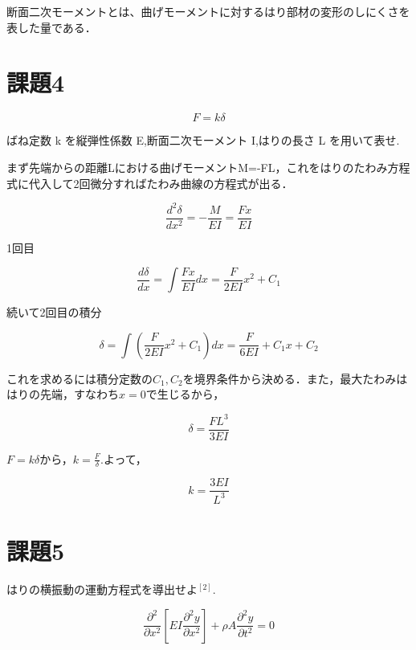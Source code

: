 \documentclass[twocolumn,xelatex,ja=standard,jafont=noto]{bxjsarticle}
\begin{document}
断面二次モーメントとは、曲げモーメントに対するはり部材の変形のしにくさを表した量である．


\section{課題4}

\begin{equation}
			F=k\delta
\end{equation}

ばね定数 k を縦弾性係数 E,断面二次モーメント I,はりの長さ L を用いて表せ.




まず先端からの距離Lにおける曲げモーメントM=-FL，これをはりのたわみ方程式に代入して2回微分すればたわみ曲線の方程式が出る．


\begin{equation}
		\frac{d^{2}\delta}{dx^{2}}=-\frac{M}{EI}=\frac{Fx}{EI}
\end{equation}

1回目

\begin{equation}
		\frac{d\delta}{dx}=\int\frac{Fx}{EI}dx=\frac{F}{2EI}x^{2}+C_{1}
\end{equation}

続いて2回目の積分


\begin{equation}
		\delta=\int(\frac{F}{2EI}x^{2}+C_{1})dx=\frac{F}{6EI}+C_{1}x+C_{2}
\end{equation}

これを求めるには積分定数の$ C_{1},C_{2} $を境界条件から決める．また，最大たわみははりの先端，すなわち$ x=0 $で生じるから，

\begin{equation}
	\delta=\frac{FL^{3}}{3EI}
\end{equation}


$ F=k\delta $から，$ k=\frac{F}{\delta} $.よって，



\begin{equation}
	k=\frac{3EI}{L^{3}}
\end{equation}





\section{課題5}
はりの横振動の運動方程式を導出せよ$ ^{[2]} $.

\begin{equation}
			\frac{\partial^{2}}{\partial x^{2}}[EI\frac{\partial^{2}y}{\partial x^{2}}]+\rho A\frac{\partial^{2}y}{\partial t^{2}}=0
\end{equation}
\end{document}
